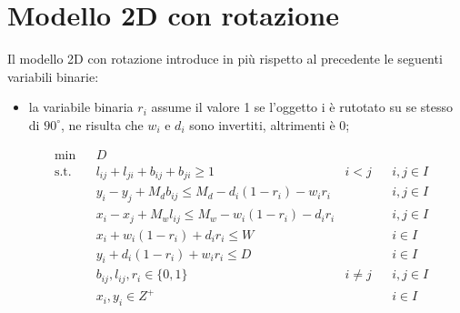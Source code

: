 \newpage

\section{Modello 2D con rotazione}
Il modello 2D con rotazione introduce in più rispetto al precedente le seguenti variabili binarie:
\begin{itemize}
    \item la variabile binaria $r_{i}$ assume il valore 1 se l'oggetto i è rutotato su se stesso di $90^{\circ}$, ne risulta che $w_{i}$ e $d_{i}$ sono invertiti, altrimenti è 0;
\end{itemize}

\begin{equation*}
    \begin{aligned}
    & \underset{}{\text{min}}
    & & D \\
    & \text{s.t.} & &  l_{ij} + l_{ji} + b_{ij} + b_{ji} \geq 1 & i < j & & i,j \in I \\
    & & & y_i - y_j + M_d b_{ij} \leq M_d - d_i (1 - r_i) - w_i r_i & & & i,j \in I \\
    & & & x_i - x_j + M_w l_{ij} \leq M_w - w_i (1 - r_i) - d_i r_i & & & i,j \in I \\
    & & & x_i + w_i (1 - r_i) + d_i r_i \leq W & & & i \in I \\
    & & & y_i + d_i (1 - r_i) + w_i r_i \leq D & & & i \in I \\
    & & & b_{ij}, l_{ij}, r_i \in \{0,1\} & i \neq j & & i,j \in I \\
    & & & x_{i}, y_{i} \in Z^{+} & & & i \in I \\
    \end{aligned}
\end{equation*}

\newpage

